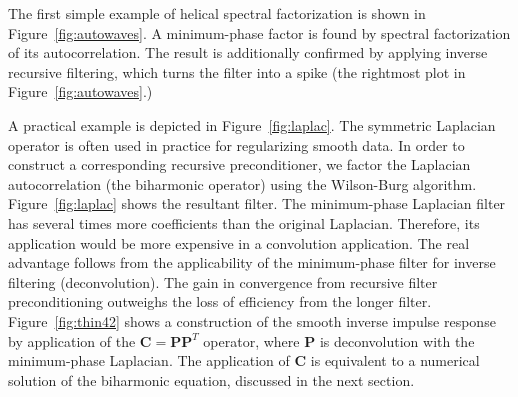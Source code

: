 
The first simple example of helical spectral factorization is shown in
Figure~\ref{fig:autowaves}. A minimum-phase factor is found by
spectral factorization of its autocorrelation. The result is
additionally confirmed by applying inverse recursive filtering, which
turns the filter into a spike (the rightmost plot in
Figure~\ref{fig:autowaves}.)


A practical example is depicted in Figure~\ref{fig:laplac}.  The
symmetric Laplacian operator is often used in practice for
regularizing smooth data. In order to construct a corresponding
recursive preconditioner, we factor the Laplacian autocorrelation
(the biharmonic operator) using the Wilson-Burg algorithm.
Figure~\ref{fig:laplac} shows the resultant filter. The minimum-phase
Laplacian filter has several times more coefficients than the original
Laplacian. Therefore, its application would be more expensive in a
convolution application. The real advantage follows from the
applicability of the minimum-phase filter for inverse filtering
(deconvolution). The gain in convergence from recursive filter
preconditioning outweighs the loss of efficiency from the longer
filter.  Figure~\ref{fig:thin42} shows a construction of the smooth
inverse impulse response by application of the $\mathbf{C} = \mathbf{P
  P}^T$ operator, where $\mathbf{P}$ is deconvolution with the
minimum-phase Laplacian. The application of $\mathbf{C}$ is equivalent
to a numerical solution of the biharmonic equation, discussed in the
next section.




